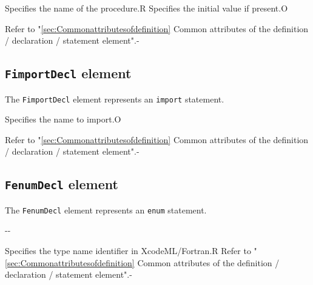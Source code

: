 \begin{XcodeMLChildElements}
{Specifies the name of the procedure.}{R}
{Specifies the initial value if present.}{O}
\end{XcodeMLChildElements}

\begin{XcodeMLAttributes}
{Refer to "\ref{sec:Commonattributesofdefinition} Common attributes of the definition / declaration / statement element".}{-}
\end{XcodeMLAttributes}


\subsection{ {\tt FimportDecl} element}

The {\tt FimportDecl} element represents an {\tt import} statement.


\begin{XcodeMLChildElements}
{Specifies the name to import.}{O}
\end{XcodeMLChildElements}

\begin{XcodeMLAttributes}
{Refer to "\ref{sec:Commonattributesofdefinition} Common attributes of the definition / declaration / statement element".}{-}
\end{XcodeMLAttributes}


\subsection{ {\tt FenumDecl} element}

The {\tt FenumDecl} element represents an {\tt enum} statement.


\begin{XcodeMLChildElements}
  \XcodeMLElementDef{-}
  {-}{-}
\end{XcodeMLChildElements}

\begin{XcodeMLAttributes}
{Specifies the type name identifier in XcodeML/Fortran.}{R}
{Refer to "\ref{sec:Commonattributesofdefinition} Common attributes of the definition / declaration / statement element".}{-}
\end{XcodeMLAttributes}

